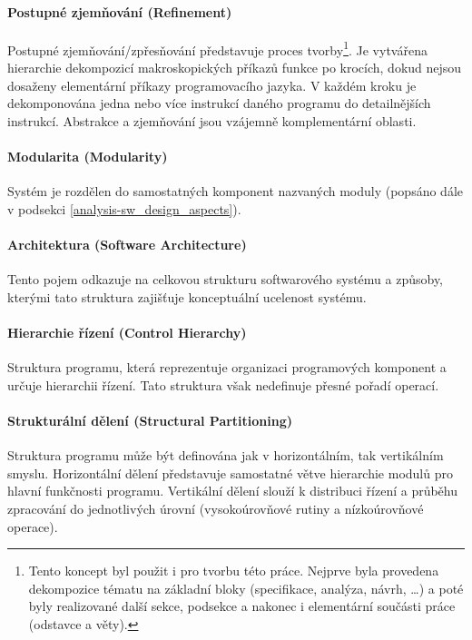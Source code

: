 \paragraph{Postupné zjemňování (Refinement)} Postupné zjemňování/zpřesňování představuje proces tvorby\footnote{Tento koncept byl použit i pro tvorbu této práce. Nejprve byla provedena dekompozice tématu na základní bloky (specifikace, analýza, návrh, \ldots) a poté byly  realizované další sekce, podsekce a nakonec i elementární součásti práce (odstavce a věty).}. Je vytvářena hierarchie dekompozicí makroskopických příkazů funkce po krocích, dokud nejsou dosaženy elementární příkazy programovacího jazyka. V každém kroku je dekomponována jedna nebo více instrukcí daného programu do detailnějších instrukcí. Abstrakce a zjemňování jsou vzájemně komplementární oblasti.

\paragraph{Modularita (Modularity)} Systém je rozdělen do samostatných komponent nazvaných moduly (popsáno dále v podsekci \ref{analysis-sw_design_aspects}).

\paragraph{Architektura (Software Architecture)} Tento pojem odkazuje na celkovou strukturu softwarového systému a způsoby, kterými tato struktura zajišťuje konceptuální ucelenost systému.

\paragraph{Hierarchie řízení (Control Hierarchy)} Struktura programu, která reprezentuje organizaci programových komponent a určuje hierarchii řízení. Tato struktura však nedefinuje přesné pořadí operací.

\paragraph{Strukturální dělení (Structural Partitioning)} Struktura programu může být definována jak v horizontálním, tak vertikálním smyslu. Horizontální dělení představuje samostatné větve hierarchie modulů pro hlavní funkčnosti programu. Vertikální dělení slouží k distribuci řízení a průběhu zpracování do jednotlivých úrovní (vysokoúrovňové rutiny a nízkoúrovňové operace).

